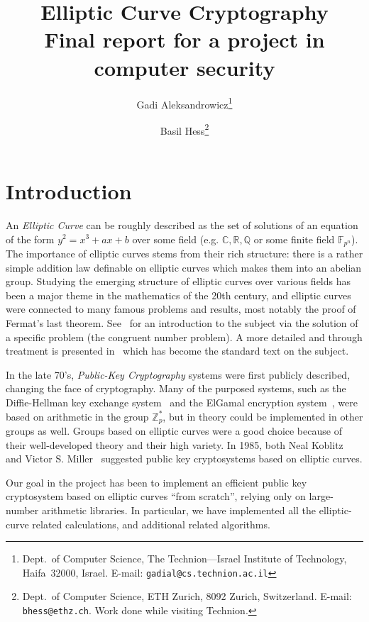 \documentclass[11pt,english]{article}
\begin{document}

\title{Elliptic Curve Cryptography\\Final report for a project in computer security}
\author{
   Gadi Aleksandrowicz\thanks{
      Dept.\ of Computer Science,
      The Technion---Israel Institute of Technology,
      Haifa~32000, Israel.
      E-mail: {\tt gadial@cs.technion.ac.il}
   } \and
   Basil Hess\thanks{
      Dept.\ of Computer Science,
      ETH Zurich,
      8092 Zurich, Switzerland.
      E-mail: {\tt bhess@ethz.ch}. Work done while visiting Technion.
   }
}
\date{}
\maketitle

\section{Introduction}
An \emph{Elliptic Curve} can be roughly described as the set of solutions of an equation of the form $y^2=x^3+ax+b$ over some field (e.g. $\mathbb{C}, 
\mathbb{R},\mathbb{Q}$ or some finite field $\mathbb{F}_{p^n}$). The importance of elliptic curves stems from their rich structure: there is a rather simple
addition law definable on elliptic curves which makes them into an abelian group. Studying the emerging structure of elliptic curves over various fields has been a
major theme in the mathematics of the 20th century, and elliptic curves were connected to many famous problems and results, most notably the proof of Fermat's
last theorem. See~\cite{Ko84} for an introduction to the subject via the solution of a specific problem (the congruent number problem). A more detailed and through
treatment is presented in~\cite{Sil86} which has become the standard text on the subject.

In the late 70's, \emph{Public-Key Cryptography} systems were first publicly described, changing the face of cryptography. Many of the purposed systems, such
as the Diffie-Hellman key exchange system~\cite{Diffie76newdirections} and the ElGamal encryption system~\cite{19480}, were based on arithmetic in the group $\mathbb{Z}^*_p$, but in theory could
be implemented in other groups as well. Groups based on elliptic curves were a good choice because of their well-developed theory and their high variety. In 1985,
both Neal Koblitz~\cite{Ko87} and Victor S. Miller~\cite{Mil85} suggested public key cryptosystems based on elliptic curves.

Our goal in the project has been to implement an efficient public key cryptosystem based on elliptic curves ``from scratch'', relying only on large-number arithmetic
libraries. In particular, we have implemented all the elliptic-curve related calculations, and additional related algorithms.
\end{document}
